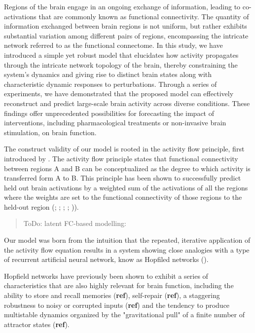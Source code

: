 \documentclass{article}
\begin{document}
Regions of the brain engage in an ongoing exchange of information, leading to co-activations that are commonly known as functional connectivity.
The quantity of information exchanged between brain regions is not uniform, but rather exhibits substantial variation among different pairs of regions, encompassing the intricate network referred to as the functional connectome.
In this study, we have introduced a simple yet robust model that elucidates how activity propagates through the intricate network topology of the brain, thereby constraining the system's dynamics and giving rise to distinct brain states along with characteristic dynamic responses to perturbations.
Through a series of experiments, we have demonstrated that the proposed model can effectively reconstruct and predict large-scale brain activity across diverse conditions. These findings offer unprecedented possibilities for forecasting the impact of interventions, including pharmacological treatments or non-invasive brain stimulation, on brain function.

The construct validity of our model is rooted in the activity flow principle, first introduced by \href{https://doi.org/10.1038/nn.4406}{}. The activity flow principle states that functional connectivity between regions A and B can be conceptualized as the degree to which activity is transferred form A to B. This principle has been shown to successfully predict held out brain activations by a weighted sum of the activations of all the regions where the weights are set to the functional connectivity of those regions to the held-out region (\href{https://doi.org/10.1038/nn.4406}{}; \href{https://doi.org/10.1038/s41467-017-01000-w}{}; \href{https://doi.org/10.1371/journal.pbio.3001686}{}; \href{https://doi.org/10.1126/sciadv.abf2513}{}; \href{https://doi.org/10.1089/brain.2018.0586}{})).

\begin{quote}
ToDo: latent FC-based modelling: \href{https://doi.org/10.1162/netn\_a\_00234}{}
\end{quote}

Our model was born from the intuition that the repeated, iterative application of the activity flow equation results in a system showing close analogies with a type of recurrent artificial neural network, know as Hopfiled networks (\href{https://doi.org/10.1073/pnas.79.8.2554}{}).

Hopfield networks have previously been shown to exhibit a series of characteristics that are also highly relevant for brain function, including the ability to store and recall memories (\textbf{ref}), self-repair (\textbf{ref}), a staggering robustness to noisy or corrupted inputs (\textbf{ref}) and the tendency to produce multistable dynamics organized by the "gravitational pull" of a finite number of attractor states (\textbf{ref}).
\end{document}
